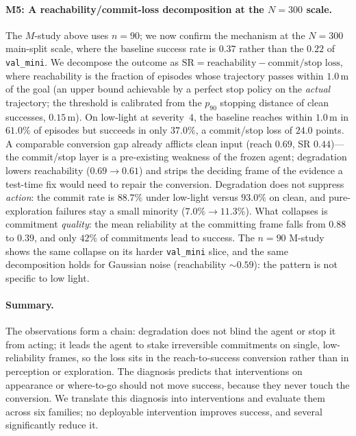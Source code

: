 \paragraph{M5: A reachability/commit-loss decomposition at the $N{=}300$ scale.}
The $M$-study above uses $n{=}90$; we now confirm the mechanism at the
$N{=}300$ main-split scale, where the baseline success rate is $0.37$ rather
than the $0.22$ of \texttt{val\_mini}. We decompose the outcome as
$\text{SR} = \text{reachability} - \text{commit/stop loss}$, where reachability
is the fraction of episodes whose trajectory passes within $1.0$\,m of the goal
(an upper bound achievable by a perfect stop policy on the \emph{actual}
trajectory; the threshold is calibrated from the $p_{90}$ stopping
distance of clean successes, $0.15$\,m). On low-light at severity~$4$,
the baseline reaches within $1.0$\,m in $61.0\%$ of episodes but succeeds in
only $37.0\%$, a commit/stop loss of $24.0$ points. A comparable
conversion gap already afflicts clean input (reach $0.69$, SR $0.44$)---the
commit/stop layer is a pre-existing weakness of the frozen agent;
degradation lowers reachability ($0.69\to0.61$) and strips the deciding
frame of the evidence a test-time fix would need to repair the conversion.
Degradation does not suppress \emph{action}: the commit rate is
$88.7\%$ under low-light versus $93.0\%$ on clean, and pure-exploration
failures stay a small minority ($7.0\%\to11.3\%$). What collapses is
commitment \emph{quality}: the mean reliability at the committing frame
falls from $0.88$ to $0.39$, and only $42\%$ of commitments lead to
success. The $n{=}90$ M-study shows the same collapse on its harder
\texttt{val\_mini} slice, and the same decomposition holds for Gaussian
noise (reachability ${\sim}0.59$): the pattern is not specific to low
light.

\paragraph{Summary.}
The observations form a chain: degradation does not blind the
agent or stop it from acting; it leads the agent to stake irreversible
commitments on single, low-reliability frames, so the loss sits in the
reach-to-success conversion rather than in perception or exploration. The
diagnosis predicts that interventions on appearance or where-to-go should
not move success, because they never touch the conversion. We translate this 
diagnosis into  interventions and evaluate them across six families; no deployable intervention improves success, and several significantly reduce it.
